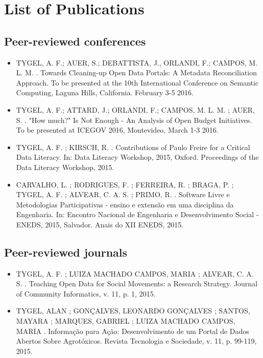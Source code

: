 
\chapter{List of Publications}

\section{Peer-reviewed conferences}
\begin{itemize}

\item TYGEL, A. F.; AUER, S.; DEBATTISTA, J., ORLANDI, F.; CAMPOS, M. L. M. . Towards Cleaning-up Open Data Portals: A Metadata Reconciliation Approach. To be presented at the 10th International Conference on Semantic Computing, Laguna Hills, California. February 3-5 2016.

\item TYGEL, A. F.; ATTARD, J.; ORLANDI, F.; CAMPOS, M. L. M. ; AUER, S. . "How much?" Is Not Enough - An Analysis of Open Budget Initiatives. To be presented at ICEGOV 2016, Montevideo, March 1-3 2016.

\item TYGEL, A. F. ; KIRSCH, R. . Contributions of Paulo Freire for a Critical Data Literacy. In: Data Literacy Workshop, 2015, Oxford. Proceedings of the Data Literacy Workshop, 2015. 

\item CARVALHO, L. ; RODRIGUES, F. ; FERREIRA, R. ; BRAGA, P. ; TYGEL, A. F. ; ALVEAR, C. A. S. ; PRIMO, R. . Software Livre e Metodologias Participativas - ensino e extensão em uma disciplina da Engenharia. In: Encontro Nacional de Engenharia e Desenvolvimento Social - ENEDS, 2015, Salvador. Anais do XII ENEDS, 2015.

\end{itemize}

\section{Peer-reviewed journals}
\begin{itemize}

\item TYGEL, A. F. ; LUIZA MACHADO CAMPOS, MARIA ; ALVEAR, C. A. S. . Teaching Open Data for Social Movements: a Research Strategy. Journal of Community Informatics, v. 11, p. 1, 2015.

\item TYGEL, ALAN ; GONÇALVES, LEONARDO GONÇALVES ; SANTOS, MAYARA ; MARQUES, GABRIEL ; LUIZA MACHADO CAMPOS, MARIA . Informação para Ação: Desenvolvimento de um Portal de Dados Abertos Sobre Agrotóxicos. Revista Tecnologia e Sociedade, v. 11, p. 99-119, 2015. 
\end{itemize}

